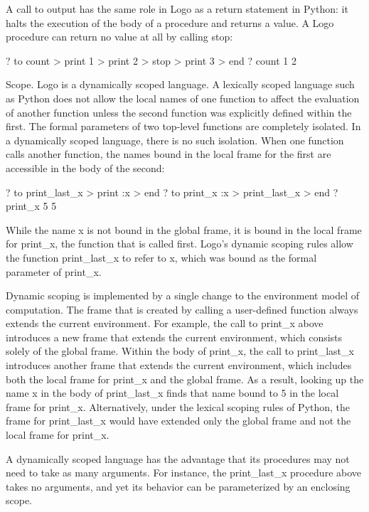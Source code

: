 \documentclass[letterpaper,10pt,dvipdfmx]{sphinxmanual}
\begin{document}
A call to output has the same role in Logo as a return statement in Python: it halts the execution of the body of a procedure and returns a value. A Logo procedure can return no value at all by calling stop:

? to count
\textgreater{} print 1
\textgreater{} print 2
\textgreater{} stop
\textgreater{} print 3
\textgreater{} end
? count
1
2

Scope. Logo is a dynamically scoped language. A lexically scoped language such as Python does not allow the local names of one function to affect the evaluation of another function unless the second function was explicitly defined within the first. The formal parameters of two top-level functions are completely isolated. In a dynamically scoped language, there is no such isolation. When one function calls another function, the names bound in the local frame for the first are accessible in the body of the second:

? to print\_last\_x
\textgreater{} print :x
\textgreater{} end
? to print\_x :x
\textgreater{} print\_last\_x
\textgreater{} end
? print\_x 5
5

While the name x is not bound in the global frame, it is bound in the local frame for print\_x, the function that is called first. Logo's dynamic scoping rules allow the function print\_last\_x to refer to x, which was bound as the formal parameter of print\_x.

Dynamic scoping is implemented by a single change to the environment model of computation. The frame that is created by calling a user-defined function always extends the current environment. For example, the call to print\_x above introduces a new frame that extends the current environment, which consists solely of the global frame. Within the body of print\_x, the call to print\_last\_x introduces another frame that extends the current environment, which includes both the local frame for print\_x and the global frame. As a result, looking up the name x in the body of print\_last\_x finds that name bound to 5 in the local frame for print\_x. Alternatively, under the lexical scoping rules of Python, the frame for print\_last\_x would have extended only the global frame and not the local frame for print\_x.

A dynamically scoped language has the advantage that its procedures may not need to take as many arguments. For instance, the print\_last\_x procedure above takes no arguments, and yet its behavior can be parameterized by an enclosing scope.
\end{document}
